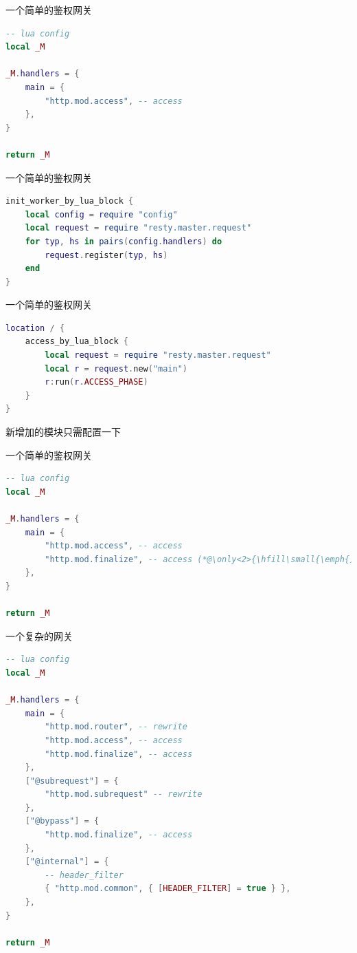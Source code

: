 \documentclass[aspectratio=32]{beamer}
\begin{document}
\begin{frame}[fragile]{一个简单的鉴权网关}
\small
\begin{lstlisting}[language=lua]
-- lua config
local _M

_M.handlers = {
    main = {
        "http.mod.access", -- access
    },
}

return _M
\end{lstlisting}
\end{frame}

\begin{frame}[fragile]{一个简单的鉴权网关}
\small
\begin{lstlisting}[language=lua]
init_worker_by_lua_block {
    local config = require "config"
    local request = require "resty.master.request"
    for typ, hs in pairs(config.handlers) do
        request.register(typ, hs)
    end
}
\end{lstlisting}
\end{frame}

\begin{frame}[fragile]{一个简单的鉴权网关}
\small
\begin{lstlisting}[language=lua]
location / {
    access_by_lua_block {
        local request = require "resty.master.request"
        local r = request.new("main")
        r:run(r.ACCESS_PHASE)
    }
}
\end{lstlisting}
\end{frame}

\begin{frame}[standout]
新增加的模块只需配置一下
\end{frame}

\begin{frame}[fragile]{一个简单的鉴权网关}
\small
\begin{lstlisting}[language=lua]
-- lua config
local _M

_M.handlers = {
    main = {
        "http.mod.access", -- access
        "http.mod.finalize", -- access (*@\only<2>{\hfill\small{\emph{只需配置}}}@*)
    },
}

return _M
\end{lstlisting}
\end{frame}

\begin{frame}[fragile]{一个复杂的网关}
\scriptsize
\begin{lstlisting}[language=lua]
-- lua config
local _M

_M.handlers = {
    main = {
        "http.mod.router", -- rewrite
        "http.mod.access", -- access
        "http.mod.finalize", -- access
    },
    ["@subrequest"] = {
        "http.mod.subrequest" -- rewrite
    },
    ["@bypass"] = {
        "http.mod.finalize", -- access
    },
    ["@internal"] = {
        -- header_filter
        { "http.mod.common", { [HEADER_FILTER] = true } },
    },
}

return _M
\end{lstlisting}
\end{frame}
\end{document}
